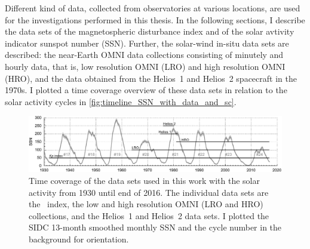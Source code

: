 Different kind of data, collected from observatories at various locations, are used for the investigations performed in this thesis. In the following sections, I describe the data sets of the magnetospheric disturbance index \Kp{} and of the solar avtivity indicator sunspot number (SSN). Further, the solar-wind in-situ data sets are described: the near-Earth OMNI data collections consisting of minutely and hourly data, that is, low resolution OMNI (LRO) and high resolution OMNI (HRO), and the data obtained from the Helios~1 and Helios~2 spacecraft in the 1970s. I plotted a time coverage overview of these data sets in relation to the solar activity cycles in \autoref{fig:timeline_SSN_with_data_and_sc}.\\
\begin{figure}[htb]
	\centering
	\includegraphics[width=\textwidth]{figures_of_mine/gnuplots/timeline_SSN_with_data_and_sc.pdf}
	\caption[]
	{Time coverage of the data sets used in this work with the solar activity from 1930 until end of 2016. The individual data sets are the \Kp~index, the low and high resolution OMNI (LRO and HRO) collections, and the Helios~1 and Helios~2 data sets. I plotted the SIDC 13-month smoothed monthly SSN and the cycle number in the background for orientation.}
	\label{fig:timeline_SSN_with_data_and_sc}
\end{figure}
% 


